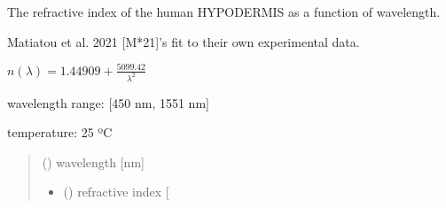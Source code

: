 \documentclass[letterpaper,10pt,english]{sphinxmanual}
\begin{document}

\begin{fulllineitems}
\label{\detokenize{05_refractive_index:skinoptics.refractive_index.n_HY_Matiatou}}
\pysigstartsignatures
{}
\pysigstopsignatures
\begin{DUlineblock}{0em}
\item[] The refractive index of the human HYPODERMIS as a function of wavelength.
\item[] Matiatou et al. 2021 {[}M*21{]}’s fit to their own experimental data.
\end{DUlineblock}

\sphinxAtStartPar
\(n(\lambda) = 1.44909 + \frac{5099.42}{\lambda^2}\)

\begin{DUlineblock}{0em}
\item[] wavelength range: {[}450 nm, 1551 nm{]}
\item[] temperature: 25 ºC
\end{DUlineblock}
\begin{quote}\begin{description}
\sphinxAtStartPar
{} () \textendash{} wavelength {[}nm{]}

\sphinxAtStartPar
\begin{itemize}
\item {} 
\sphinxAtStartPar
{} () \textendash{} refractive index {[}\sphinxhyphen{}{]}

\end{itemize}


\end{description}\end{quote}

\end{fulllineitems}

\end{document}
